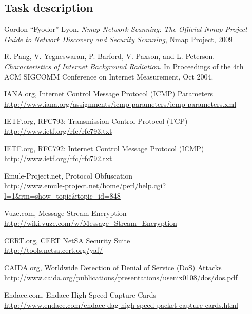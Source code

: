 \documentclass[a4paper]{scrartcl}
\begin{document}
\subsection{Task description}


\newpage
\begin{thebibliography}{9}

	 Gordon ``Fyodor'' Lyon. \emph{Nmap Network Scanning: The Official Nmap Project Guide to Network Discovery and Security Scanning},
	Nmap Project,
	2009
	
	 R. Pang, V. Yegneswaran, P. Barford, V. Paxson, and L. Peterson. \emph{Characteristics of Internet Background Radiation}. In Proceedings of the 4th ACM SIGCOMM Conference on Internet Measurement, Oct 2004.
	
	 IANA.org, Internet Control Message Protocol (ICMP) Parameters \\
	\url{http://www.iana.org/assignments/icmp-parameters/icmp-parameters.xml}
	
	 IETF.org, RFC793: Transmission Control Protocol (TCP) \\
	\url{http://www.ietf.org/rfc/rfc793.txt}
	
	 IETF.org, RFC792: Internet Control Message Protocol (ICMP) \\
	\url{http://www.ietf.org/rfc/rfc792.txt}
	
	 Emule-Project.net, Protocol Obfuscation \\
	\url{http://www.emule-project.net/home/perl/help.cgi?l=1&rm=show_topic&topic_id=848}
	
	 Vuze.com, Message Stream Encryption \\
	\url{http://wiki.vuze.com/w/Message_Stream_Encryption}
	
	 CERT.org, CERT NetSA Security Suite \\
	\url{http://tools.netsa.cert.org/yaf/}
	
	 CAIDA.org, Worldwide Detection of Denial of Service (DoS) Attacks \\
	\url{http://www.caida.org/publications/presentations/usenix0108/dos/dos.pdf}
	
	 Endace.com, Endace High Speed Capture Cards \\
	\url{http://www.endace.com/endace-dag-high-speed-packet-capture-cards.html}
	
\end{thebibliography}
\end{document}

